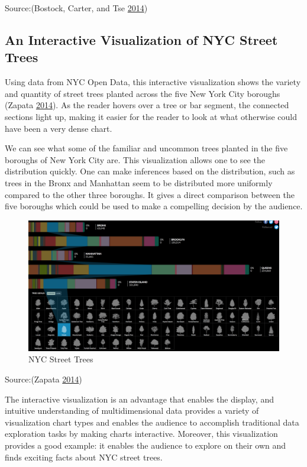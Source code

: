 \documentclass[]{book}
\begin{document}
Source:(Bostock, Carter, and Tse \protect\hyperlink{ref-rent_or_buy}{2014})

\hypertarget{an-interactive-visualization-of-nyc-street-trees}{%
\subsection{An Interactive Visualization of NYC Street Trees}\label{an-interactive-visualization-of-nyc-street-trees}}

Using data from NYC Open Data, this interactive visualization shows the variety and quantity of street trees planted across the five New York City boroughs (Zapata \protect\hyperlink{ref-trees}{2014}). As the reader hovers over a tree or bar segment, the connected sections light up, making it easier for the reader to look at what otherwise could have been a very dense chart.

We can see what some of the familiar and uncommon trees planted in the five boroughs of New York City are. This visualization allows one to see the distribution quickly. One can make inferences based on the distribution, such as trees in the Bronx and Manhattan seem to be distributed more uniformly compared to the other three boroughs. It gives a direct comparison between the five boroughs which could be used to make a compelling decision by the audience.

\begin{figure}
\centering
\includegraphics{images/NY_trees.png}
\caption{NYC Street Trees}
\end{figure}

Source:(Zapata \protect\hyperlink{ref-trees}{2014})

The interactive visualization is an advantage that enables the display, and intuitive understanding of multidimensional data provides a variety of visualization chart types and enables the audience to accomplish traditional data exploration tasks by making charts interactive. Moreover, this visualization provides a good example: it enables the audience to explore on their own and finds exciting facts about NYC street trees.
\end{document}
